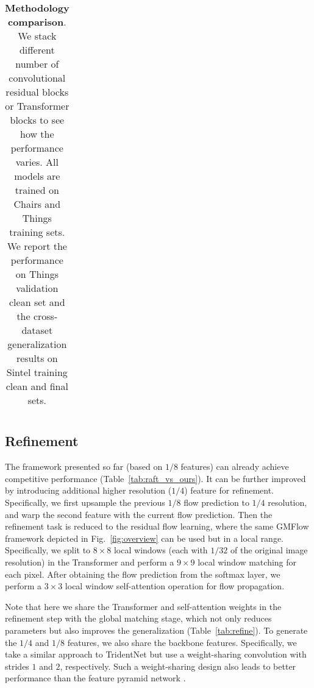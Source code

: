 \documentclass[10pt,twocolumn,letterpaper]{article}
\begin{document}
\begin{table*}[t]
\begin{tabular}{lcccccccccccccccccc}
    \bottomrule
    \end{tabular}
    \vspace{-5pt}
    \caption{\textbf{Methodology comparison}. We stack different number of convolutional residual blocks or Transformer blocks to see how the performance varies. All models are trained on Chairs and Things training sets. We report the performance on Things validation clean set and the cross-dataset generalization results on Sintel training clean and final sets. 
    }
    \label{tab:conv_vs_softmax}
    \vspace{-6pt}
\end{table*}







\subsection{Refinement}
\label{sec:refine}

The framework presented so far (based on $1/8$ features) can already achieve competitive performance (Table~\ref{tab:raft_vs_ours}). It can be further improved by introducing additional higher resolution ($1/4$) feature for refinement. Specifically, we first upsample the previous $1/8$ flow prediction to $1/4$ resolution, and warp the second feature with the current flow prediction. Then the refinement task is reduced to the residual flow learning, where the same GMFlow framework depicted in Fig.~\ref{fig:overview} can be used but in a local range. Specifically, we split to $8 \times 8$ local windows (each with $1/32$ of the original image resolution) in the Transformer and perform a $9 \times 9$ local window matching for each pixel. After obtaining the flow prediction from the softmax layer, we perform a $3 \times 3$ local window self-attention operation for flow propagation. 



Note that here we share the Transformer and self-attention weights in the refinement step with the global matching stage, which not only reduces parameters but also improves the generalization (Table~\ref{tab:refine}). To generate the $1/4$ and $1/8$ features, we also share the backbone features. Specifically, we take a similar approach to TridentNet \cite{li2019scale} but use a weight-sharing convolution with strides $1$ and $2$, respectively. Such a weight-sharing design also leads to better performance than the feature pyramid network \cite{lin2017feature}. 
\end{document}
